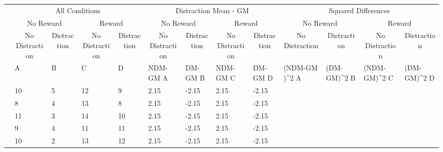 \documentclass[
]{book}
\begin{document}
\begin{table}
\centering
\begin{tabular}{l|l|l|l|l|l|l|l|l|>{}l|>{}l|>{}l|>{}l}
\hline
\multicolumn{1}{c|}{ } & \multicolumn{4}{c|}{All Conditions} & \multicolumn{4}{c|}{Distraction Mean - GM} & \multicolumn{4}{c}{Squared Differences} \\
\cline{2-5} \cline{6-9} \cline{10-13}
\multicolumn{1}{c|}{ } & \multicolumn{2}{c|}{No Reward} & \multicolumn{2}{c|}{Reward} & \multicolumn{2}{c|}{No Reward} & \multicolumn{2}{c|}{Reward} & \multicolumn{2}{c|}{No Reward} & \multicolumn{2}{c}{Reward} \\
\cline{2-3} \cline{4-5} \cline{6-7} \cline{8-9} \cline{10-11} \cline{12-13}
\multicolumn{1}{c|}{ } & \multicolumn{1}{c|}{No Distraction} & \multicolumn{1}{c|}{Distraction} & \multicolumn{1}{c|}{No Distraction} & \multicolumn{1}{c|}{Distraction} & \multicolumn{1}{c|}{No Distraction} & \multicolumn{1}{c|}{Distraction} & \multicolumn{1}{c|}{No Distraction} & \multicolumn{1}{c|}{Distraction} & \multicolumn{1}{c|}{No Distraction} & \multicolumn{1}{c|}{Distraction} & \multicolumn{1}{c|}{No Distraction} & \multicolumn{1}{c}{Distraction} \\
\cline{2-2} \cline{3-3} \cline{4-4} \cline{5-5} \cline{6-6} \cline{7-7} \cline{8-8} \cline{9-9} \cline{10-10} \cline{11-11} \cline{12-12} \cline{13-13}
  & A & B & C & D & NDM-GM A & DM-GM B & NDM-GM C & DM-GM D & (NDM-GM )\textasciicircum{}2 A & (DM-GM)\textasciicircum{}2 B & (NDM-GM)\textasciicircum{}2 C & (DM-GM)\textasciicircum{}2 D\\
\hline
 & 10 & 5 & 12 & 9 & 2.15 & -2.15 & 2.15 & -2.15 & \cellcolor{yellow}{4.6225} & \cellcolor{yellow}{4.6225} & \cellcolor{yellow}{4.6225} & \cellcolor{yellow}{4.6225}\\
\hline
 & 8 & 4 & 13 & 8 & 2.15 & -2.15 & 2.15 & -2.15 & \cellcolor{yellow}{4.6225} & \cellcolor{yellow}{4.6225} & \cellcolor{yellow}{4.6225} & \cellcolor{yellow}{4.6225}\\
\hline
 & 11 & 3 & 14 & 10 & 2.15 & -2.15 & 2.15 & -2.15 & \cellcolor{yellow}{4.6225} & \cellcolor{yellow}{4.6225} & \cellcolor{yellow}{4.6225} & \cellcolor{yellow}{4.6225}\\
\hline
 & 9 & 4 & 11 & 11 & 2.15 & -2.15 & 2.15 & -2.15 & \cellcolor{yellow}{4.6225} & \cellcolor{yellow}{4.6225} & \cellcolor{yellow}{4.6225} & \cellcolor{yellow}{4.6225}\\
\hline
 & 10 & 2 & 13 & 12 & 2.15 & -2.15 & 2.15 & -2.15 & \cellcolor{yellow}{4.6225} & \cellcolor{yellow}{4.6225} & \cellcolor{yellow}{4.6225} & \cellcolor{yellow}{4.6225}\\

\end{tabular}
\end{table}
\end{document}
